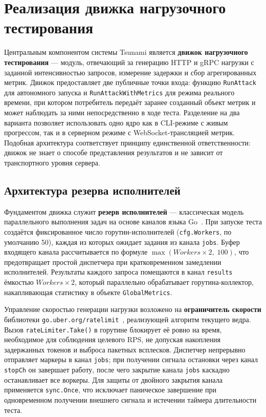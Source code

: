 \section{Реализация движка нагрузочного тестирования}

Центральным компонентом системы Tsunami является \textbf{движок нагрузочного тестирования} --- модуль, отвечающий за генерацию HTTP и gRPC нагрузки с заданной интенсивностью запросов, измерение задержки и сбор агрегированных метрик.
Движок предоставляет две публичные точки входа: функцию \texttt{RunAttack} для автономного запуска и \texttt{RunAttackWithMetrics} для режима реального времени, при котором потребитель передаёт заранее созданный объект метрик и может наблюдать за ними непосредственно в ходе теста.
Разделение на два варианта позволяет использовать одно ядро как в CLI-режиме с живым прогрессом, так и в серверном режиме с WebSocket-трансляцией метрик.
Подобная архитектура соответствует принципу единственной ответственности: движок не знает о способе представления результатов и не зависит от транспортного уровня сервера.

\subsection*{Архитектура резерва исполнителей}

Фундаментом движка служит \textbf{резерв исполнителей} --- классическая модель параллельного выполнения задач на основе каналов языка Go~\cite{gospec}.
При запуске теста создаётся фиксированное число горутин-исполнителей (\texttt{cfg.Workers}, по умолчанию 50), каждая из которых ожидает задания из канала \texttt{jobs}.
Буфер входящего канала рассчитывается по формуле \(\max(\mathit{Workers} \times 2,\; 100)\), что предотвращает простой диспетчера при кратковременном замедлении исполнителей.
Результаты каждого запроса помещаются в канал \texttt{results} ёмкостью \(\mathit{Workers} \times 2\), который параллельно обрабатывает горутина-коллектор, накапливающая статистику в объекте \texttt{GlobalMetrics}.

Управление скоростью генерации нагрузки возложено на \textbf{ограничитель скорости} библиотеки \texttt{go.uber.org/ratelimit}~\cite{ratelimit}, реализующей алгоритм текущего ведра.
Вызов \texttt{rateLimiter.Take()} в горутине блокирует её ровно на время, необходимое для соблюдения целевого RPS, не допуская накопления задержанных токенов и выброса пакетных всплесков.
Диспетчер непрерывно отправляет маркеры в канал \texttt{jobs}; при получении сигнала остановки через канал \texttt{stopCh} он завершает работу, после чего закрытие канала \texttt{jobs} каскадно останавливает все воркеры.
Для защиты от двойного закрытия канала применяется \texttt{sync.Once}, что исключает паническое завершение при одновременном получении внешнего сигнала и истечении таймера длительности теста.

